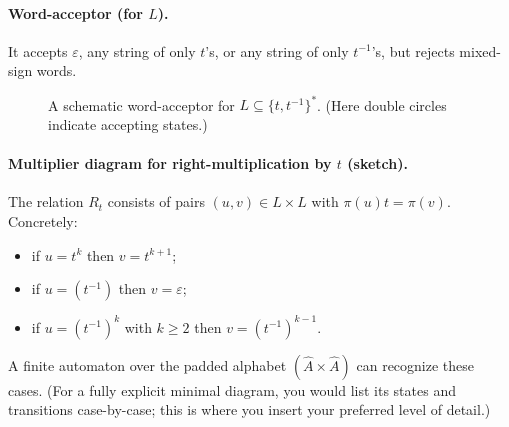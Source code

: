 \documentclass[11pt]{article}
\theoremstyle{definition}
\theoremstyle{plain}
\theoremstyle{remark}
\begin{document}
\paragraph{Word-acceptor (for $L$).}
It accepts $\varepsilon$, any string of only $t$'s, or any string of only $t^{-1}$'s, but rejects mixed-sign words.

\begin{figure}[h]
\centering
{}
\caption{A schematic word-acceptor for $L\subseteq\{t,t^{-1}\}^*$. (Here double circles indicate accepting states.)}
\end{figure}

\paragraph{Multiplier diagram for right-multiplication by $t$ (sketch).}
The relation $R_t$ consists of pairs $(u,v)\in L\times L$ with $\pi(u)t=\pi(v)$.
Concretely:
\begin{itemize}[leftmargin=2em]
\item if $u=t^k$ then $v=t^{k+1}$;
\item if $u=(t^{-1})$ then $v=\varepsilon$;
\item if $u=(t^{-1})^k$ with $k\ge 2$ then $v=(t^{-1})^{k-1}$.
\end{itemize}
A finite automaton over the padded alphabet $(\widehat A\times\widehat A)$ can recognize these cases.
(For a fully explicit minimal diagram, you would list its states and transitions case-by-case; this is where you insert your preferred level of detail.)
\end{document}
